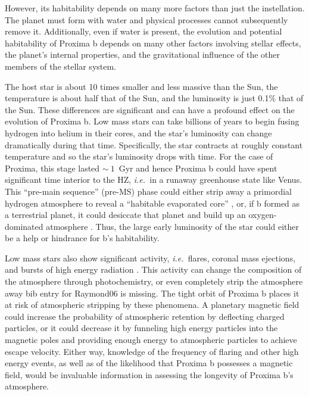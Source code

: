 \documentclass[preprint,12pt]{aastex}
\newcommand{\xxx}[1]{{\color{red} #1}} %
\def\eg{{\it e.g.\ }}
\def\ie{{\it i.e.\ }}
\begin{document}
However, its habitability depends on many more factors than just the
instellation. The planet must form with water and physical processes
cannot subsequently remove it. Additionally, even if water is present,
the evolution and potential habitability of Proxima b depends on many
other factors involving stellar effects, the planet's internal properties, and the
gravitational influence of the other members of the stellar system.

The host star is about 10 times smaller and less massive than the Sun,
the temperature is about half that of the Sun, and the luminosity is
just 0.1\% that of the Sun. These differences are significant and can
have a profound effect on the evolution of Proxima b. Low mass stars
can take billions of years to begin fusing hydrogen into helium in
their cores, and the star's luminosity can change \xxx{dramatically} during that
time. Specifically, the star contracts at roughly constant temperature and so
the star's luminosity drops with time. For the case of Proxima, this
stage lasted $\sim~1$~Gyr \citep{Baraffe15} and hence Proxima b
could have spent significant time interior to the HZ, \ie in a runaway
greenhouse state like Venus. This ``pre-main sequence'' (pre-MS) phase could
either strip away a primordial hydrogen atmosphere to reveal a
``habitable evaporated core'' \citep{Luger15}, or, if b formed as a
terrestrial planet, it could desiccate that planet and build up an
oxygen-dominated atmosphere \citep{LugerBarnes15}. Thus, the large
early luminosity of the star could either be a help or hindrance for
b's habitability.

Low mass stars also show significant activity, \ie flares, coronal
mass ejections, and bursts of high energy radiation
\citep[\eg][]{West08}. This activity can change the composition of the
atmosphere through photochemistry, or even completely strip the
atmosphere away \citep{Raymond06} \xxx{bib entry for Raymond06
is missing}. The tight orbit of Proxima b places
it at risk of atmospheric stripping by these phenomena. A planetary
magnetic field could increase the probability of atmospheric retention
by deflecting charged particles, or it could decrease it by funneling
high energy particles into the magnetic poles and providing enough
energy to atmospheric particles to achieve escape velocity. Either
way, knowledge of the frequency of flaring and other high energy
events, as well as of the likelihood that Proxima b possesses a
magnetic field, would be invaluable information in assessing the
longevity of Proxima b's atmosphere.
\end{document}
